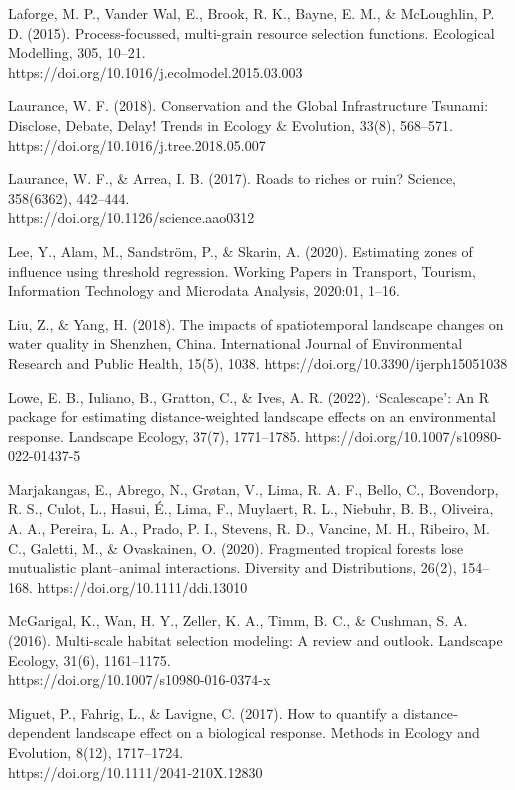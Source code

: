 \documentclass[titlepage]{article}
\begin{document}
Laforge, M. P., Vander Wal, E., Brook, R. K., Bayne, E. M., & McLoughlin, P. D. (2015). Process-focussed, multi-grain resource selection functions. Ecological Modelling, 305, 10–21.\\ https://doi.org/10.1016/j.ecolmodel.2015.03.003

Laurance, W. F. (2018). Conservation and the Global Infrastructure Tsunami: Disclose, Debate, Delay! Trends in Ecology & Evolution, 33(8), 568–571. https://doi.org/10.1016/j.tree.2018.05.007

Laurance, W. F., & Arrea, I. B. (2017). Roads to riches or ruin? Science, 358(6362), 442–444. \\
https://doi.org/10.1126/science.aao0312

Lee, Y., Alam, M., Sandström, P., & Skarin, A. (2020). Estimating zones of influence using threshold regression. Working Papers in Transport, Tourism, Information Technology and Microdata Analysis, 2020:01, 1–16.

Liu, Z., & Yang, H. (2018). The impacts of spatiotemporal landscape changes on water quality in Shenzhen, China. International Journal of Environmental Research and Public Health, 15(5), 1038. https://doi.org/10.3390/ijerph15051038

Lowe, E. B., Iuliano, B., Gratton, C., & Ives, A. R. (2022). ‘Scalescape’: An R package for estimating distance-weighted landscape effects on an environmental response. Landscape Ecology, 37(7), 1771–1785. https://doi.org/10.1007/s10980-022-01437-5

Marjakangas, E., Abrego, N., Grøtan, V., Lima, R. A. F., Bello, C., Bovendorp, R. S., Culot, L., Hasui, É., Lima, F., Muylaert, R. L., Niebuhr, B. B., Oliveira, A. A., Pereira, L. A., Prado, P. I., Stevens, R. D., Vancine, M. H., Ribeiro, M. C., Galetti, M., & Ovaskainen, O. (2020). Fragmented tropical forests lose mutualistic plant–animal interactions. Diversity and Distributions, 26(2), 154–168. https://doi.org/10.1111/ddi.13010

McGarigal, K., Wan, H. Y., Zeller, K. A., Timm, B. C., & Cushman, S. A. (2016). Multi-scale habitat selection modeling: A review and outlook. Landscape Ecology, 31(6), 1161–1175.\\ https://doi.org/10.1007/s10980-016-0374-x

Miguet, P., Fahrig, L., & Lavigne, C. (2017). How to quantify a distance‐dependent landscape effect on a biological response. Methods in Ecology and Evolution, 8(12), 1717–1724. \\
https://doi.org/10.1111/2041-210X.12830
\end{document}
